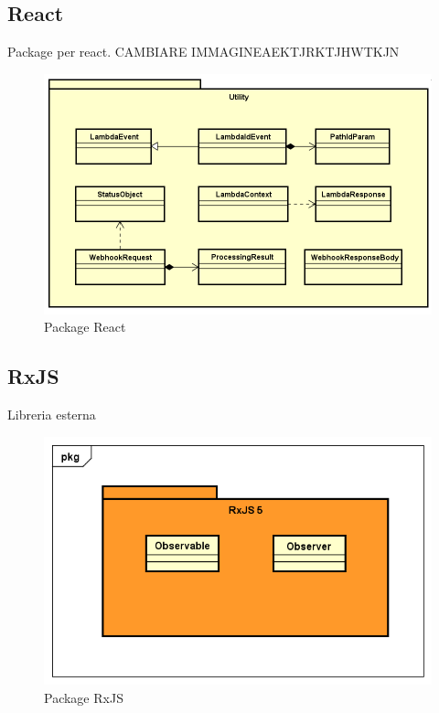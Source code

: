 \subsection{React}
Package per react. CAMBIARE IMMAGINEAEKTJRKTJHWTKJN
\begin{figure}[h] \centering \includegraphics[width=\textwidth,height=\textheight,keepaspectratio]{images/diagrams/back-end/Official_Backend_0304/Utility.png}
\caption{Package React}
\end{figure}
\newpage

\subsection{RxJS}
Libreria esterna
\begin{figure}[h] \centering \includegraphics[width=\textwidth,height=\textheight,keepaspectratio]{images/diagrams/back-end/Official_Backend_0304/RxJS.png}
\caption{Package RxJS}
\end{figure}
\newpage


